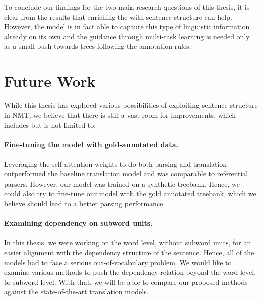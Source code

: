To conclude our findings for the two main research questions of this thesis, it is clear from the results that enriching the \transformer with sentence structure can help.
However, the \transformer model is in fact able to capture this type of linguistic information already on its own and the guidance through multi-task learning is needed only as a small push towards trees following the annotation rules.



\section*{Future Work}

While this thesis has explored various possibilities of exploiting sentence structure in NMT, we believe that there is still a vast room for improvements, which includes but is not limited to:

\paragraph{Fine-tuning the \DepParse model with gold-annotated data.}
Leveraging the self-attention weights to do both parsing and translation outperformed the baseline translation model and was comparable to referential parsers.
However, our model was trained on a synthetic treebank.
Hence, we could also try to fine-tune our model with the gold annotated treebank, which we believe should lead to a better parsing performance.

\paragraph{Examining dependency on subword units.}
In this thesis, we were working on the word level, without subword units, for an easier alignment with the dependency structure of the sentence.
Hence, all of the models had to face a serious out-of-vocabulary problem.
We would like to examine various methods to push the dependency relation beyond the word level, to subword level.
With that, we will be able to compare our proposed methods against the state-of-the-art translation models.
